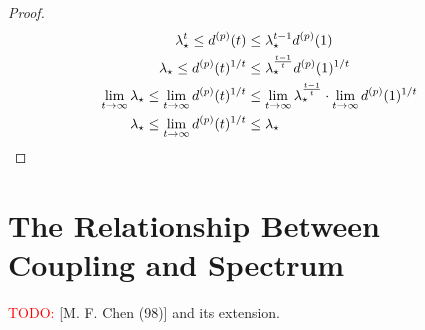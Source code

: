 \documentclass[utf8]{article}
\begin{document}
\begin{proof}
  \begin{align*}
    \lambda^t_\star \leq d^{(p)}(t) &\leq \lambda_\star^{t-1} d^{(p)}(1) \\
    \lambda_\star \leq d^{(p)}(t)^{1/t} &\leq \lambda_\star^{\frac{t-1}{t}} d^{(p)}(1)^{1/t} \\
    \lim_{t\to\infty} \lambda_\star \leq \lim_{t\to\infty} d^{(p)}(t)^{1/t} &\leq \lim_{t\to\infty}\lambda_\star^{\frac{t-1}{t}} \cdot \lim_{t\to\infty} d^{(p)}(1)^{1/t} \\
    \lambda_\star \leq \lim_{t\to\infty} d^{(p)}(t)^{1/t} &\leq \lambda_\star \qedhere
  \end{align*}
\end{proof}

\section{The Relationship Between Coupling and Spectrum}
\textcolor{red}{TODO:} [M. F. Chen (98)] and its extension.
\end{document}
